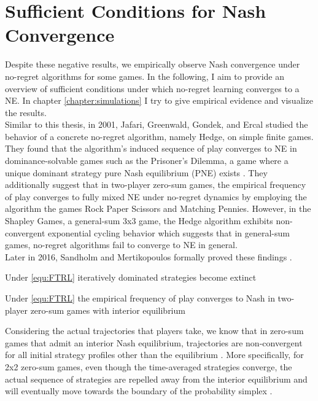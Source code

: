 \section{Sufficient Conditions for Nash Convergence}\label{section:SufficientConditionsForNash Convergence}

Despite these negative results, we empirically observe Nash convergence under no-regret algorithms for some games. In the following, I aim to provide an overview of sufficient conditions under which no-regret learning converges to a NE. In chapter \ref{chapter:simulations} I try to give empirical evidence and visualize the results. \\

Similar to this thesis, in 2001, Jafari, Greenwald, Gondek, and Ercal studied the behavior of a concrete no-regret algorithm, namely Hedge, on simple finite games. They found that the algorithm's induced sequence of play converges to NE in dominance-solvable games such as the Prisoner's Dilemma, a game where a unique dominant strategy pure Nash equilibrium (PNE) exists \cite{jafari}. They additionally suggest that in two-player zero-sum games, the empirical frequency of play converges to fully mixed NE under no-regret dynamics by employing the algorithm the games Rock Paper Scissors and Matching Pennies. However, in the Shapley Games, a general-sum 3x3 game, the Hedge algorithm exhibits non-convergent exponential cycling behavior \cite{jafari} which suggests that in general-sum games, no-regret algorithms fail to converge to NE in general.\\

Later in 2016, Sandholm and Mertikopoulos formally proved these findings \cite[Theorem 4.1 and Theorem 6.1]{sandholm}.

\begin{proposition}\label{prop:dominantedStrategiesExtinct}
    Under \ref{equ:FTRL} iteratively dominated strategies become extinct
\end{proposition}

\begin{proposition}\label{prop:empiricalFrequencyConvergence}
    Under \ref{equ:FTRL} the empirical frequency of play converges to Nash in two-player zero-sum games with interior equilibrium
\end{proposition}

Considering the actual trajectories that players take, we know that in zero-sum games that admit an interior Nash equilibrium, trajectories are non-convergent for all initial strategy profiles other than the equilibrium \cite{bailey}. More specifically, for 2x2 zero-sum games, even though the time-averaged strategies converge, the actual sequence of strategies are repelled away from the interior equilibrium and will eventually move towards the boundary of the probability simplex \cite[Theorem 1]{bailey}. \\

